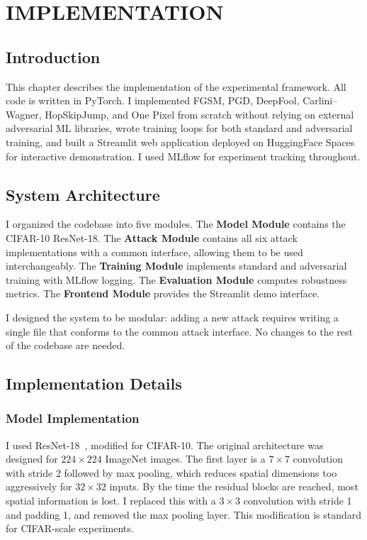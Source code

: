 \chapter{IMPLEMENTATION}
\label{ch:implementation}

\section{Introduction}

This chapter describes the implementation of the experimental framework. All code is written in PyTorch. I implemented FGSM, PGD, DeepFool, Carlini--Wagner, HopSkipJump, and One Pixel from scratch without relying on external adversarial ML libraries, wrote training loops for both standard and adversarial training, and built a Streamlit web application deployed on HuggingFace Spaces for interactive demonstration. I used MLflow for experiment tracking throughout.

\section{System Architecture}

I organized the codebase into five modules. The \textbf{Model Module} contains the CIFAR-10 ResNet-18. The \textbf{Attack Module} contains all six attack implementations with a common interface, allowing them to be used interchangeably. The \textbf{Training Module} implements standard and adversarial training with MLflow logging. The \textbf{Evaluation Module} computes robustness metrics. The \textbf{Frontend Module} provides the Streamlit demo interface.

I designed the system to be modular: adding a new attack requires writing a single file that conforms to the common attack interface. No changes to the rest of the codebase are needed.

\section{Implementation Details}

\subsection{Model Implementation}

I used ResNet-18~\cite{he2016deep}, modified for CIFAR-10. The original architecture was designed for $224 \times 224$ ImageNet images. The first layer is a $7 \times 7$ convolution with stride 2 followed by max pooling, which reduces spatial dimensions too aggressively for $32 \times 32$ inputs. By the time the residual blocks are reached, most spatial information is lost. I replaced this with a $3 \times 3$ convolution with stride 1 and padding 1, and removed the max pooling layer. This modification is standard for CIFAR-scale experiments.


